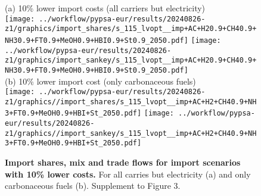 \begin{figure*}
    \centering
    (a) 10\% lower import costs (all carriers but electricity) \\
    \texttt{[image: ../workflow/pypsa-eur/results/20240826-z1/graphics/import\_shares/s\_115\_lvopt\_\_imp+AC+H20.9+CH40.9+NH30.9+FT0.9+MeOH0.9+HBI0.9+St0.9\_2050.pdf]}
    \texttt{[image: ../workflow/pypsa-eur/results/20240826-z1/graphics/import\_sankey/s\_115\_lvopt\_\_imp+AC+H20.9+CH40.9+NH30.9+FT0.9+MeOH0.9+HBI0.9+St0.9\_2050.pdf]} \\

    (b) 10\% lower import cost (only carbonaceous fuels) \\
    \texttt{[image: ../workflow/pypsa-eur/results/20240826-z1/graphics//import\_shares/s\_115\_lvopt\_\_imp+AC+H2+CH40.9+NH3+FT0.9+MeOH0.9+HBI+St\_2050.pdf]}
    \texttt{[image: ../workflow/pypsa-eur/results/20240826-z1/graphics//import\_sankey/s\_115\_lvopt\_\_imp+AC+H2+CH40.9+NH3+FT0.9+MeOH0.9+HBI+St\_2050.pdf]} \\
    \caption{\textbf{Import shares, mix and trade flows for import scenarios with 10\% lower
    costs.} For all carries but electricity (a) and only carbonaceous fuels (b).
    Supplement to Figure 3.}
    \label{fig:si:import-shares-b}
\end{figure*}

